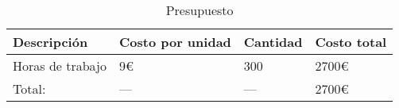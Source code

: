 \chapter{\ChapterFive{}}


\begin{table}[!ht]
\centering
\caption{Presupuesto}
\label{tabla-presupuesto}
\begin{tabular}{|l|l|l|l|}
\hline
Descripción      & Costo por unidad & Cantidad & Costo total \\ \hline
Horas de trabajo & 9\euro{}         & 300      & 2700\euro{} \\ \hline
Total:           & ---              & ---      & 2700\euro{} \\ \hline
\end{tabular}
\end{table}